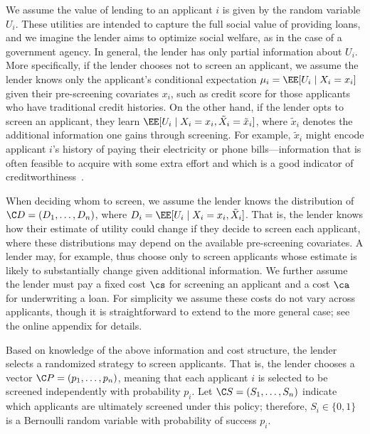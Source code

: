 \documentclass[10pt]{article}
\begin{document}
\begin{ReviewVerbatim}
We assume the value of lending to an applicant \(i\) is given by the random variable \(U_i\).
These utilities are intended to capture the full social value of providing loans, and we imagine the lender aims to optimize social welfare, as in the case of a government agency.
In general, the lender has only partial information about \(U_i\). More specifically, if the lender chooses not to screen an applicant, we assume the lender knows only the applicant's conditional expectation \(\mu_i = \EE [U_i \mid X_i = x_i]\)
given their pre-screening covariates \(x_i\), such as credit score for those applicants who have traditional credit histories.
On the other hand, if the lender opts to screen an applicant, they learn \(\EE[U_i \mid X_i = x_i, \tilde{X}_i = \tilde{x}_i]\), where \(\tilde{x}_i\) denotes the additional information one gains through screening.
For example, \(\tilde{x}_i\) might encode applicant \(i\)'s history of paying
their electricity or phone bills---information that is often feasible to acquire with some extra effort and which is a good indicator of creditworthiness~\cite{fdic2018}.

When deciding whom to screen, we assume
the lender knows the distribution of \(\C D = (D_1, \ldots, D_n)\), where \(D_i = \EE[U_i \mid X_i = x_i, \tilde{X}_i]\).
That is, the lender knows how their estimate of utility could change if they decide to screen each applicant, where these distributions may depend on the available pre-screening covariates.
A lender may, for example, thus choose only to screen applicants whose estimate is likely to substantially change given additional information.
We further assume the lender must pay a
fixed cost \(\cs\) for screening an applicant
and a cost \(\ca\) for underwriting a loan.
For simplicity we assume these costs do not vary across applicants, though it is straightforward to extend to the more general case; see the online appendix for details.

Based on knowledge of the above information and cost structure, the lender selects a randomized strategy to screen applicants.
That is, the lender chooses a vector
\(\C P = (p_1, \dots, p_n)\), meaning that each applicant \(i\) is selected to be screened independently with probability \(p_i\).
Let \(\C S = (S_1, \dots, S_n)\) indicate which applicants are ultimately screened under this policy; therefore, \(S_i \in \{0,1\}\) is a Bernoulli random variable with probability of success \(p_i\).


\end{ReviewVerbatim}
\end{document}
